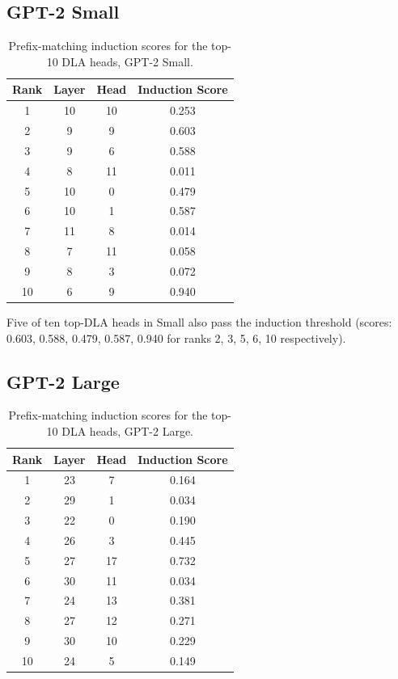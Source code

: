 \documentclass[11pt]{article}
\begin{document}
\subsection{GPT-2 Small}

\begin{table}[H]
\centering
\caption{Prefix-matching induction scores for the top-10 DLA heads,
GPT-2 Small.}
\label{tab:induction_small}
\begin{tabular}{cccc}
\toprule
\textbf{Rank} & \textbf{Layer} & \textbf{Head} & \textbf{Induction Score} \\
\midrule
1  & 10 & 10 & 0.253 \\
2  &  9 &  9 & 0.603 \\
3  &  9 &  6 & 0.588 \\
4  &  8 & 11 & 0.011 \\
5  & 10 &  0 & 0.479 \\
6  & 10 &  1 & 0.587 \\
7  & 11 &  8 & 0.014 \\
8  &  7 & 11 & 0.058 \\
9  &  8 &  3 & 0.072 \\
10 &  6 &  9 & 0.940 \\
\bottomrule
\end{tabular}
\end{table}

Five of ten top-DLA heads in Small also pass the induction threshold (scores:
0.603, 0.588, 0.479, 0.587, 0.940 for ranks 2, 3, 5, 6, 10 respectively).

\subsection{GPT-2 Large}

\begin{table}[H]
\centering
\caption{Prefix-matching induction scores for the top-10 DLA heads,
GPT-2 Large.}
\label{tab:induction_large}
\begin{tabular}{cccc}
\toprule
\textbf{Rank} & \textbf{Layer} & \textbf{Head} & \textbf{Induction Score} \\
\midrule
1  & 23 &  7 & 0.164 \\
2  & 29 &  1 & 0.034 \\
3  & 22 &  0 & 0.190 \\
4  & 26 &  3 & 0.445 \\
5  & 27 & 17 & 0.732 \\
6  & 30 & 11 & 0.034 \\
7  & 24 & 13 & 0.381 \\
8  & 27 & 12 & 0.271 \\
9  & 30 & 10 & 0.229 \\
10 & 24 &  5 & 0.149 \\
\bottomrule
\end{tabular}
\end{table}
\end{document}
